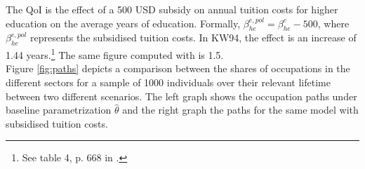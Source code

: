 The QoI is the effect of a 500 USD subsidy on annual tuition costs for higher education on the average years of education. Formally, $\beta_{he}^{e,pol} = \beta_{he}^e - 500$, where $\beta_{he}^{e,pol}$ represents the subsidised tuition costs. In KW94, the effect is an increase of 1.44 years.\footnote{See table 4, p. 668 in \cite{Keane.1994}.} The same figure computed with  is 1.5.\\
\newline
Figure \ref{fig:paths} depicts a comparison between the shares of occupations in the different sectors for a sample of 1000 individuals over their relevant lifetime between two different scenarios. The left graph shows the occupation paths under baseline parametrization $\hat{\theta}$ and the right graph the paths for the same model with subsidised tuition costs.


